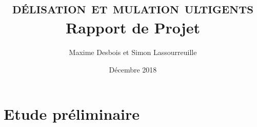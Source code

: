 \documentclass{article}
\title{%
    \vspace*{\fill}
    \textbf{\scshape \tcol{Mo}délisation et \tcol{Si}mulation \tcol{M}ulti\tcol{A}gents}\\
    Rapport de Projet
}
\author{
    Maxime Desbois et Simon Lassourreuille
}
\date{
    Décembre 2018
    \vspace*{\fill}
}
\begin{document}
\maketitle

\clearpage

\section{Etude préliminaire}
\end{document}
